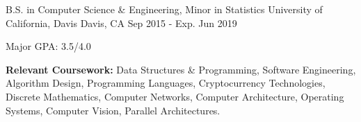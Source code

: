 

\begin{cventries}
  \cventry
    {B.S. in Computer Science \& Engineering, Minor in Statistics} %
    {University of California, Davis} %
    {Davis, CA} %
    {Sep 2015 - Exp. Jun 2019} %
    {
      \begin{cvitems} %
        \item {Major GPA: 3.5/4.0}
      \end{cvitems}
    }

\end{cventries}

\begin{cvparagraph}
  \textbf{Relevant Coursework: }
  Data Structures \& Programming, Software Engineering, Algorithm Design,
  Programming Languages, Cryptocurrency Technologies, Discrete Mathematics,
  Computer Networks, Computer Architecture, Operating Systems, Computer Vision,
  Parallel Architectures.
\end{cvparagraph}
